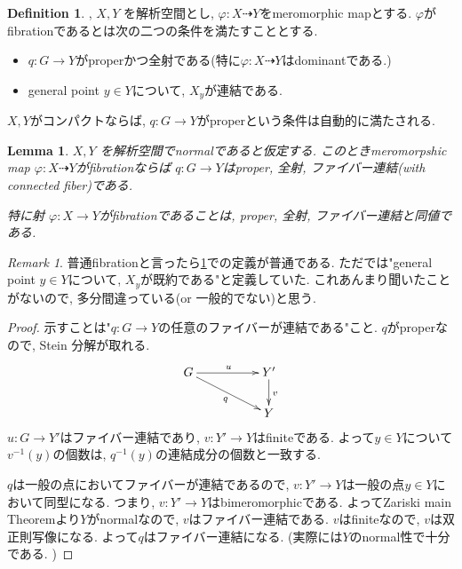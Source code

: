 \documentclass[dvipdfmx,a4paper,11pt]{article} %
\newtheorem{lem}[thm]{Lemma}
\theoremstyle{definition}
\newtheorem{defn}[thm]{Definition}
\theoremstyle{remark}
\newtheorem{rem}[thm]{Remark}
\numberwithin{equation}{section}
\begin{document}
\begin{defn}\cite[Definition 3.3]{Uen75}, \cite[Subsection 1.1.2]{Cam04}
\(X, Y\) を解析空間とし, $\varphi : X \dashrightarrow Y$をmeromorphic mapとする. 
$\varphi$がfibrationであるとは次の二つの条件を満たすこととする.
\begin{itemize}
\item $q : G \to Y$がproperかつ全射である(特に$\varphi : X \dashrightarrow Y$はdominantである.)
\item general point $y\in Y$について, $X_y$が連結である.
\end{itemize}
\end{defn}
$X, Y$がコンパクトならば, $q : G \to Y$がproperという条件は自動的に満たされる. 

\begin{lem}
\label{lem-fibration}
\(X, Y\) を解析空間でnormalであると仮定する. 
このときmeromorpshic map $\varphi : X \dashrightarrow Y$がfibrationならば
$q : G \to Y$はproper, 全射, ファイバー連結(with connected fiber)である. 

特に射 $\varphi : X \rightarrow Y$がfibrationであることは, proper, 全射, ファイバー連結と同値である. 
\end{lem}

\begin{rem}
普通fibrationと言ったら\ref{lem-fibration}での定義が普通である. 
ただ\cite{Cam04}では"general point $y\in Y$について, $X_y$が既約である"と定義していた. 
これあんまり聞いたことがないので, 多分間違っている(or 一般的でない)と思う. 
\end{rem}

\begin{proof}
示すことは"$q : G \to Y$の任意のファイバーが連結である"こと. 
$q$がproperなので, Stein 分解が取れる. 
   \[
\xymatrix@C=50pt@R=20pt{
G  \ar@{->}[r]^{u}\ar@{->}[rd]_{q} &Y' \ar@{->}[d]^{v} \\
  &Y \\
}
\]
$u : G \to Y'$はファイバー連結であり, $v: Y'\to Y$はfiniteである. 
よって$ y \in Y$について
$v^{-1}(y)$の個数は, $q^{-1}(y)$の連結成分の個数と一致する. 

$q$は一般の点においてファイバーが連結であるので, $v : Y' \to Y$は一般の点$y \in Y$において同型になる. 
つまり, $v : Y' \to Y$はbimeromorphicである. 
よってZariski main Theoremより$Y$がnormalなので, $v$はファイバー連結である.
$v$はfiniteなので, $v$は双正則写像になる. 
よって$q$はファイバー連結になる. 
(実際には$Y$のnormal性で十分である. )
\end{proof}
\end{document}

